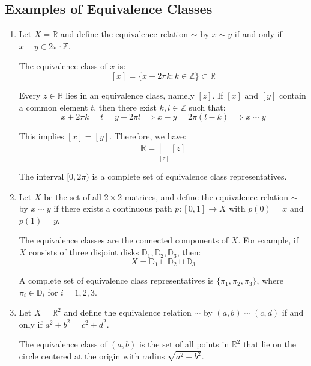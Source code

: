\documentclass[11pt, draft]{article}
\begin{document}
\subsection{Examples of Equivalence Classes}
\begin{enumerate}
    \item Let $X = \mathbb{R}$ and define the equivalence relation $\sim$ by $x \sim y$
          if and only if $x - y \in 2\pi \cdot \mathbb{Z}$.

          The equivalence class of $x$ is:
          \[
              [x] = \{ x + 2\pi k : k \in \mathbb{Z} \} \subset \mathbb{R}
          \]

          Every $z \in \mathbb{R}$ lies in an equivalence class, namely $[z]$. If $[x]$
          and $[y]$ contain a common element $t$, then there exist $k, l \in \mathbb{Z}$
          such that:
          \[
              x + 2\pi k = t = y + 2\pi l \implies x - y = 2\pi (l - k) \implies x \sim y
          \]

          This implies $[x] = [y]$. Therefore, we have:
          \[
              \mathbb{R} = \bigsqcup_{[z]} [z]
          \]

          The interval $[0, 2\pi)$ is a complete set of equivalence class
          representatives.

    \item Let $X$ be the set of all $2 \times 2$ matrices, and define the equivalence
          relation $\sim$ by $x \sim y$ if there exists a continuous path $p: [0,1]
              \rightarrow X$ with $p(0) = x$ and $p(1) = y$.

          The equivalence classes are the connected components of $X$. For example, if
          $X$ consists of three disjoint disks $\mathbb{D}_1, \mathbb{D}_2,
              \mathbb{D}_3$, then:
          \[
              X = \mathbb{D}_1 \sqcup \mathbb{D}_2 \sqcup \mathbb{D}_3
          \]

          A complete set of equivalence class representatives is $\{\pi_1, \pi_2,
              \pi_3\}$, where $\pi_i \in \mathbb{D}_i$ for $i = 1, 2, 3$.

    \item Let $X = \mathbb{R}^2$ and define the equivalence relation $\sim$ by $(a, b)
              \sim (c, d)$ if and only if $a^2 + b^2 = c^2 + d^2$.

          The equivalence class of $(a, b)$ is the set of all points in $\mathbb{R}^2$
          that lie on the circle centered at the origin with radius $\sqrt{a^2 + b^2}$.
\end{enumerate}
\end{document}
